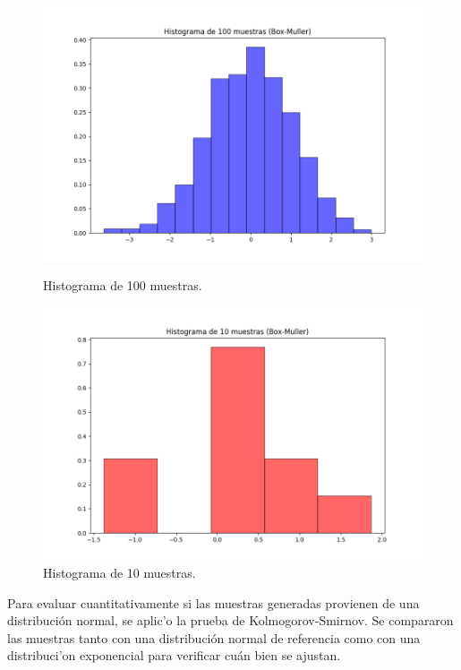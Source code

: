 \documentclass[a4paper,12pt]{article}
\begin{document}
	\begin{figure}[H]
		\centering
		\begin{minipage}{0.45\textwidth}
			\centering
			\includegraphics[width=\textwidth]{histograma100.png}
			\caption{Histograma de 100 muestras.}
			\label{fig:izquierda}
		\end{minipage}
		\hfill
		\begin{minipage}{0.45\textwidth}
			\centering
			\includegraphics[width=\textwidth]{histograma10.png}
			\caption{Histograma de 10 muestras.}
			\label{fig:derecha}
		\end{minipage}
	\end{figure}
	
	

	Para evaluar cuantitativamente si las muestras generadas provienen de una distribuci\'on normal, se aplic'o la prueba de Kolmogorov-Smirnov. Se compararon las muestras tanto con una distribuci\'on normal de referencia como con una distribuci'on exponencial para verificar cu\'an bien se ajustan.
	
\end{document}
